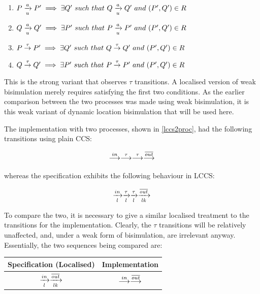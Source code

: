 \begin{enumerate}
\item $P \xrightarrow[u]{a} P^\prime \implies \exists Q^\prime\ such\
  that\ Q \xrightarrow[u]{a} Q^\prime\ and\ (P^\prime,Q^\prime) \in R$
\item $Q \xrightarrow[u]{a} Q^\prime \implies \exists P^\prime\ such\
  that\ P \xrightarrow[u]{a} P^\prime\ and\ (P^\prime,Q^\prime) \in R$
\item $P \stackrel{\tau}{\rightarrow} P^\prime \implies \exists Q^\prime\ such\
  that\ Q \stackrel{\tau}{\rightarrow} Q^\prime\ and\ (P^\prime,Q^\prime) \in R$
\item $Q \stackrel{\tau}{\rightarrow} Q^\prime \implies \exists P^\prime\ such\
  that\ P \stackrel{\tau}{\rightarrow} P^\prime\ and\ (P^\prime,Q^\prime) \in R$
\end{enumerate}

\noindent This is the strong variant that observes $\tau$ transitions.
A localised version of weak bisimulation merely requires satisfying the
first two conditions.  As the earlier comparison between the two
processes was made using weak bisimulation, it is this weak variant of
dynamic location bisimulation that will be used here.

The implementation with two processes, shown in \ref{lccs2proc}, had the
following transitions using plain CCS:

\begin{equation}
  \stackrel{in}{\longrightarrow} \stackrel{\tau}{\longrightarrow} \stackrel{\tau}{\longrightarrow} \stackrel{\overline{out}}{\longrightarrow}
\end{equation}

\noindent whereas the specification exhibits the following behaviour in
LCCS:

\begin{equation}
  \xrightarrow[l]{in} \xrightarrow[l]{\tau} \xrightarrow[l]{\tau} \xrightarrow[lk]{\overline{out}}
\end{equation}

\noindent To compare the two, it is necessary to give a similar
localised treatment to the transitions for the implementation.  Clearly,
the $\tau$ transitions will be relatively unaffected, and, under a weak
form of bisimulation, are irrelevant anyway.  Essentially, the two
sequences being compared are:

\begin{center}
\begin{tabular}{c|c}
Specification (Localised) & Implementation \\
\hline
$\xrightarrow[l]{in} \xrightarrow[lk]{\overline{out}}$ &
$\stackrel{in}{\longrightarrow} \stackrel{\overline{out}}{\longrightarrow}$
\end{tabular}
\end{center}

